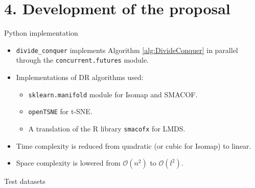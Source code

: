 \documentclass[10pt]{beamer}
\begin{document}
\section{4. Development of the proposal}

\begin{frame}[fragile]{Python implementation}
    \begin{itemize}
        \item \verb|divide_conquer| implements Algorithm \ref{alg:DivideConquer} \alert{in parallel} through the \verb|concurrent.futures| module.
        \item Implementations of DR algorithms used:
            \begin{itemize}
                \item \verb|sklearn.manifold| module \citep{Pedregosa2011} for Isomap and SMACOF.
                \item \verb|openTSNE| \citep{Poličar2023} for t-SNE.
                \item A translation of the R library \verb|smacofx| \citep{Leeuw2009} for LMDS.
            \end{itemize} 
        \item \alert{Time} complexity is reduced from quadratic (or cubic for Isomap) to \alert{linear}.
        \item \alert{Space} complexity is lowered from $\mathcal{O}(n^2)$ to \alert{$\mathcal{O}(l^2)$}.
    \end{itemize}
\end{frame}

\begin{frame}{Test datasets}
    \begin{figure}
        \centering
    \end{figure}
\end{frame}
\end{document}
